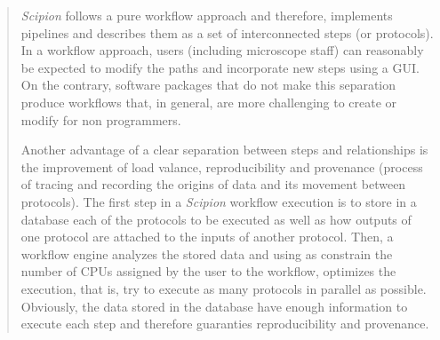 \documentclass[a4paper,12pt]{article}
\def\scipion{\textit{Scipion}\xspace}
\begin{document}
\begin{reviewer}
\begin{quote}
\scipion follows a pure workflow approach and therefore, implements pipelines and describes them as a set of interconnected steps (or protocols). In a workflow approach, users (including microscope staff) can reasonably be expected to modify the paths and incorporate new steps using a GUI. On the contrary, software packages that do not make this separation produce workflows that, in general, are more challenging to create or modify for non programmers. 

Another advantage of a clear separation between steps and relationships 
is the improvement of load valance, reproducibility and  provenance (process of tracing and recording the origins of data and its movement between protocols). The first step in a \scipion workflow execution
is to store in a database each of the protocols to be executed as well as how 
outputs of one protocol are attached to the inputs of another protocol. Then, a workflow engine analyzes the stored data and using as constrain the number of CPUs assigned by the user to the workflow, optimizes the execution, that is, try to execute as many protocols in parallel as possible. Obviously, the data stored in the database  have enough information to execute each step and therefore guaranties reproducibility and provenance.

\end{quote}






\end{reviewer}
\end{document}
